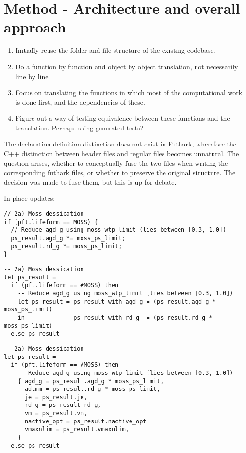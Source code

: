 \section{Method - Architecture and overall approach}
\begin{enumerate}
  \item Initially reuse the folder and file structure of the existing codebase.
  \item Do a function by function and object by object translation, not necessarily line by line.
  \item Focus on translating the functions in which most of the computational work is done first, and the dependencies of these.
  \item Figure out a way of testing equivalence between these functions and the translation. Perhaps using generated tests?
\end{enumerate}

The declaration definition distinction does not exist in Futhark, wherefore the C++ distinction between header files and regular files becomes unnatural. The question arises, whether to conceptually fuse the two files when writing the corresponding futhark files, or whether to preserve the original structure. The decision was made to fuse them, but this is up for debate.


In-place updates:

\begin{verbatim}
// 2a) Moss dessication
if (pft.lifeform == MOSS) {
  // Reduce agd_g using moss_wtp_limit (lies between [0.3, 1.0])
  ps_result.agd_g *= moss_ps_limit;
  ps_result.rd_g *= moss_ps_limit;
}
\end{verbatim}

\begin{verbatim}
-- 2a) Moss dessication
let ps_result =
  if (pft.lifeform == #MOSS) then
    -- Reduce agd_g using moss_wtp_limit (lies between [0.3, 1.0])
    let ps_result = ps_result with agd_g = (ps_result.agd_g * moss_ps_limit)
    in              ps_result with rd_g  = (ps_result.rd_g * moss_ps_limit)
  else ps_result
\end{verbatim}

\begin{verbatim}
-- 2a) Moss dessication
let ps_result =
  if (pft.lifeform == #MOSS) then
    -- Reduce agd_g using moss_wtp_limit (lies between [0.3, 1.0])
    { agd_g = ps_result.agd_g * moss_ps_limit,
      adtmm = ps_result.rd_g * moss_ps_limit,
      je = ps_result.je,
      rd_g = ps_result.rd_g,
      vm = ps_result.vm,
      nactive_opt = ps_result.nactive_opt,
      vmaxnlim = ps_result.vmaxnlim,
    }
  else ps_result
\end{verbatim}


